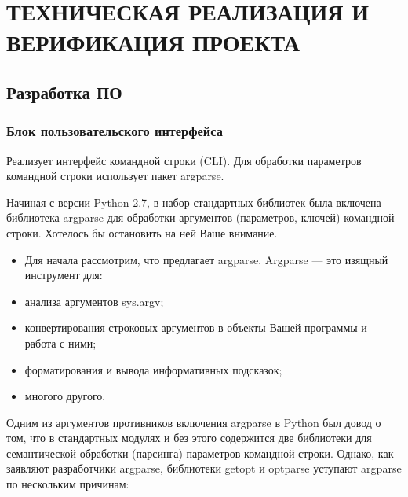 \lstset{style=pythoninlinestyle}

\section{ТЕХНИЧЕСКАЯ РЕАЛИЗАЦИЯ И ВЕРИФИКАЦИЯ ПРОЕКТА}
\label{sec:func}

\subsection{Разработка ПО}
\label{sub:func:1}

\subsubsection{Блок пользовательского интерфейса }


Реализует интерфейс командной строки (CLI). Для обработки параметров командной строки использует пакет argparse.

Начиная с версии Python 2.7, в набор стандартных библиотек была включена библиотека argparse для обработки аргументов (параметров, ключей) командной строки. Хотелось бы остановить на ней Ваше внимание.

\begin{itemize}

	\item Для начала рассмотрим, что предлагает argparse. Argparse — это изящный инструмент для:
	\item анализа аргументов sys.argv;
	\item конвертирования строковых аргументов в объекты Вашей программы и работа с ними;
	\item форматирования и вывода информативных подсказок;
	\item многого другого.

\end{itemize}


Одним из аргументов противников включения argparse в Python был довод о том, что в стандартных модулях и без этого содержится две библиотеки для семантической обработки (парсинга) параметров командной строки. Однако, как заявляют разработчики argparse, библиотеки getopt и optparse уступают argparse по нескольким причинам:

